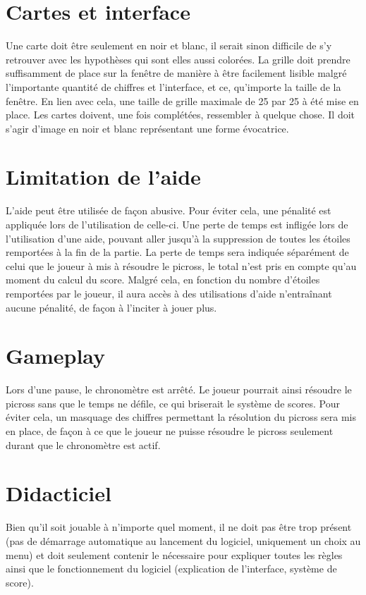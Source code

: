\documentclass{report}
\begin{document}
	\section{Cartes et interface}
		Une carte doit être seulement en noir et blanc, il serait sinon difficile de s'y retrouver avec les hypothèses qui sont elles aussi colorées.
		La grille doit prendre suffisamment de place sur la fenêtre de manière à être facilement lisible malgré l'importante quantité de chiffres et l'interface, et ce, qu'importe la taille de la fenêtre. En lien avec cela, une taille de grille maximale de 25 par 25 à été mise en place.
		Les cartes doivent, une fois complétées, ressembler à quelque chose. Il doit s'agir d'image en noir et blanc représentant une forme évocatrice.
	
	\section{Limitation de l'aide}
		L'aide peut être utilisée de façon abusive. Pour éviter cela, une pénalité est appliquée lors de l'utilisation de celle-ci. Une perte de temps est infligée lors de l'utilisation d'une aide, pouvant aller jusqu'à la suppression de toutes les étoiles remportées à la fin de la partie. La perte de temps sera indiquée séparément de celui que le joueur à mis à résoudre le picross, le total n'est pris en compte qu'au moment du calcul du score. Malgré cela, en fonction du nombre d'étoiles remportées par le joueur, il aura accès à des utilisations d'aide n'entraînant aucune pénalité, de façon à l'inciter à jouer plus.
	
	\section{Gameplay}
		Lors d'une pause, le chronomètre est arrêté. Le joueur pourrait ainsi résoudre le picross sans que le temps ne défile, ce qui briserait le système de scores. Pour éviter cela, un masquage des chiffres permettant la résolution du picross sera mis en place, de façon à ce que le joueur ne puisse résoudre le picross seulement durant que le chronomètre est actif.
		
	\section{Didacticiel}
		Bien qu'il soit jouable à n'importe quel moment, il ne doit pas être trop présent (pas de démarrage automatique au lancement du logiciel, uniquement un choix au menu) et doit seulement contenir le nécessaire pour expliquer toutes les règles ainsi que le fonctionnement du logiciel (explication de l'interface, système de score).
	
\end{document}
